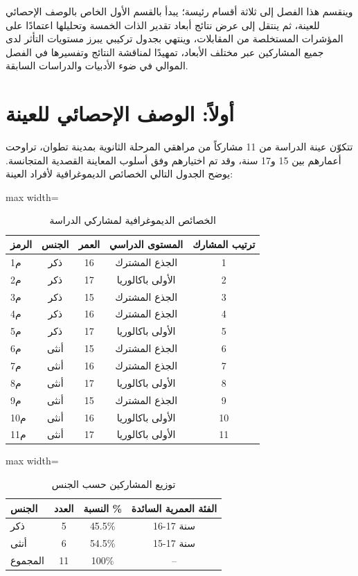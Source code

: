 \documentclass[12pt,oneside]{report}
\begin{document}
وينقسم هذا الفصل إلى ثلاثة أقسام رئيسة؛ يبدأ بالقسم الأول الخاص بالوصف الإحصائي للعينة، ثم ينتقل إلى عرض نتائج أبعاد تقدير الذات الخمسة وتحليلها اعتمادًا على المؤشرات المستخلصة من المقابلات، وينتهي بجدول تركيبي يبرز مستويات التأثر لدى جميع المشاركين عبر مختلف الأبعاد، تمهيدًا لمناقشة النتائج وتفسيرها في الفصل الموالي في ضوء الأدبيات والدراسات السابقة.

\section{أولاً: الوصف الإحصائي للعينة}
تتكوّن عينة الدراسة من 11 مشاركاً من مراهقي المرحلة الثانوية بمدينة تطوان، تراوحت أعمارهم بين 15 و17 سنة، وقد تم اختيارهم وفق أسلوب المعاينة القصدية المتجانسة. يوضح الجدول التالي الخصائص الديموغرافية لأفراد العينة:

\begin{table}[H]
\centering
\caption{الخصائص الديموغرافية لمشاركي الدراسة}
\small
\renewcommand{\arraystretch}{1.3}
\setlength{\tabcolsep}{4pt}
\begin{adjustbox}{max width=\textwidth}
\begin{tabular}{l c c c c}
\toprule
\textbf{الرمز} & \textbf{الجنس} & \textbf{العمر} & \textbf{المستوى الدراسي} & \textbf{ترتيب المشارك} \\
\midrule
م1 & ذكر & 16 & الجذع المشترك & 1 \\
م2 & ذكر & 17 & الأولى باكالوريا & 2 \\
م3 & ذكر & 15 & الجذع المشترك & 3 \\
م4 & ذكر & 16 & الجذع المشترك & 4 \\
م5 & ذكر & 17 & الأولى باكالوريا & 5 \\
م6 & أنثى & 15 & الجذع المشترك & 6 \\
م7 & أنثى & 16 & الجذع المشترك & 7 \\
م8 & أنثى & 17 & الأولى باكالوريا & 8 \\
م9 & أنثى & 15 & الجذع المشترك & 9 \\
م10 & أنثى & 16 & الأولى باكالوريا & 10 \\
م11 & أنثى & 17 & الأولى باكالوريا & 11 \\
\bottomrule
\end{tabular}
\end{adjustbox}
\end{table}
\begin{table}[H]
\centering
\caption{توزيع المشاركين حسب الجنس}
\small
\renewcommand{\arraystretch}{1.3}
\setlength{\tabcolsep}{4pt}
\begin{adjustbox}{max width=\textwidth}
\begin{tabular}{l c c c}
\toprule
\textbf{الجنس} & \textbf{العدد} & \textbf{النسبة \%} & \textbf{الفئة العمرية السائدة} \\
\midrule
ذكر & 5 & \textenglish{45.5\%} & 16-17 سنة \\
أنثى & 6 & \textenglish{54.5\%} & 15-17 سنة \\
المجموع & 11 & 100\% & -- \\
\bottomrule
\end{tabular}
\end{adjustbox}
\end{table}
\end{document}
